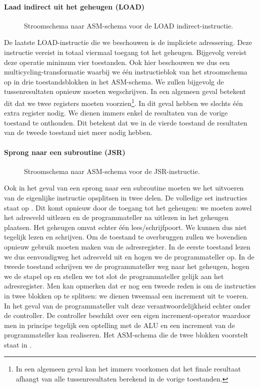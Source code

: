 \paragraph{Laad indirect uit het geheugen (LOAD)}
\begin{figure}[hbt]
\centering
{}
\caption{Stroomschema naar ASM-schema voor de LOAD indirect-instructie.}
\label{flowasm-load3}
\end{figure}
De laatste LOAD-instructie die we beschouwen is de impliciete adressering. Deze instructie vereist in totaal viermaal toegang tot het geheugen. Bijgevolg vereist deze operatie minimum vier toestanden. Ook hier beschouwen we dus een multicycling-transformatie waarbij we \'e\'en instructieblok van het stroomschema op in drie toestandsblokken in het ASM-schema. We zullen bijgevolg de tussenresultaten opnieuw moeten wegschrijven. In een algemeen geval betekent dit dat we twee registers moeten voorzien\footnote{In een algemeen geval kan het immers voorkomen dat het finale resultaat afhangt van alle tussenresultaten berekend in de vorige toestanden.}. In dit geval hebben we slechts \'e\'en extra register nodig. We dienen immers enkel de resultaten van de vorige toestand te onthouden. Dit betekent dat we in de vierde toestand de resultaten van de tweede toestand niet meer nodig hebben.
\paragraph{Sprong naar een subroutine (JSR)}
\begin{figure}[hbt]
\centering
{}
\caption{Stroomschema naar ASM-schema voor de JSR-instructie.}
\label{flowasm-jsr}
\end{figure}
Ook in het geval van een sprong naar een subroutine moeten we het uitvoeren van de eigenlijke instructie opsplitsen in twee delen. De volledige set instructies staat op . Dit komt opnieuw door de toegang tot het geheugen: we moeten zowel het adresveld uitlezen en de programmateller na uitlezen in het geheugen plaatsen. Het geheugen omvat echter \'e\'en lees/schrijfpoort. We kunnen dus niet tegelijk lezen en schrijven. Om de toestand te overbruggen zullen we bovendien opnieuw gebruik moeten maken van de adresregister. In de eerste toestand lezen we dus eenvoudigweg het adresveld uit en hogen we de programmateller op. In de tweede toestand schrijven we de programmateller weg naar het geheugen, hogen we de stapel op en stellen we tot slot de programmateller gelijk aan het adresregister. Men kan opmerken dat er nog een tweede reden is om de instructies in twee blokken op te splitsen: we dienen tweemaal een increment uit te voeren. In het geval van de programmateller valt deze verantwoordelijkheid echter onder de controller. De controller beschikt over een eigen increment-operator waardoor men in principe tegelijk een optelling met de ALU en een increment van de programmateller kan realiseren. Het ASM-schema die de twee blokken voorstelt staat in .

